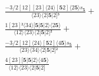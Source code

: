 \documentclass[varwidth, border=5pt]{standalone}
\begin{document}
\begin{my}
$\begin{gathered}
\scriptscriptstyle\frac{-3/2[12][23]⟨24⟩[𝟓2]⟨2𝟓⟩s_{𝟓}}{⟨23⟩⟨2|𝟓|2]³} +\\
\scriptscriptstyle\frac{1[23]²⟨34⟩[𝟓|𝟓|2⟩⟨2𝟓⟩}{⟨12⟩⟨23⟩⟨2|𝟓|2]²} +\\
\scriptscriptstyle\frac{-3/2[12]⟨24⟩[𝟓2]⟨4𝟓⟩s_{𝟓}}{⟨23⟩⟨34⟩⟨2|𝟓|2]²} +\\
\scriptscriptstyle\frac{4[23][𝟓|𝟓|2⟩⟨4𝟓⟩}{⟨12⟩⟨23⟩⟨2|𝟓|2]} \phantom{+}
\end{gathered}$
\end{my}
\end{document}
